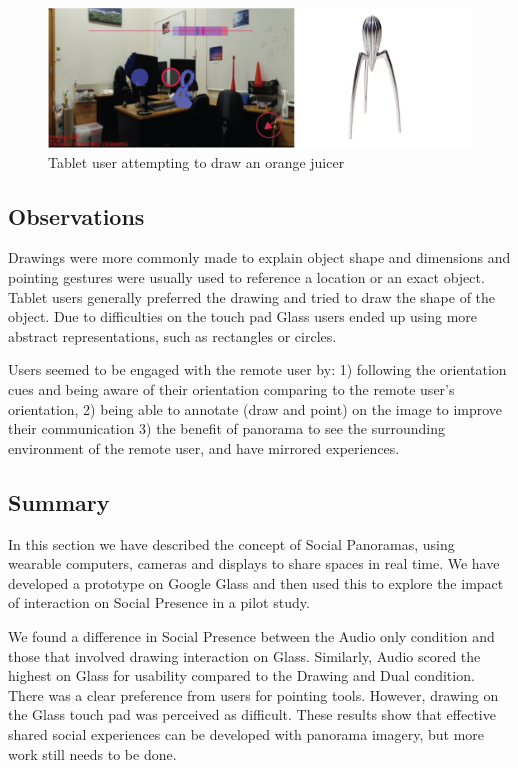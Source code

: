 \begin{figure}[ht]
	\centering
	\includegraphics[width=\linewidth]{images/ismar14/tablet-drawing}
	\caption{Tablet user attempting to draw an orange juicer}
	\label{fig:ismar14:tablet-drawing}
\end{figure}

\subsection{Observations}

Drawings were more commonly made to explain object shape and dimensions and pointing gestures were usually used to reference a location or an exact object. Tablet users generally preferred the drawing and tried to draw the shape of the object. Due to difficulties on the touch pad Glass users ended up using more abstract representations, such as rectangles or circles.

Users seemed to be engaged with the remote user by: 1) following the orientation cues and being aware of their orientation comparing to the remote user's orientation, 2) being able to annotate (draw and point) on the image to improve their communication 3) the benefit of panorama to see the surrounding environment of the remote user, and have mirrored experiences.


\subsection{Summary}

In this section we have described the concept of Social Panoramas, using wearable computers, cameras and displays to share spaces in real time. We have developed a prototype on Google Glass and then used this to explore the impact of interaction on Social Presence in a pilot study. 

We found a difference in Social Presence between the Audio only condition and those that involved drawing interaction on Glass. Similarly, Audio scored the highest on Glass for usability compared to the Drawing and Dual condition. There was a clear preference from users for pointing tools. However, drawing on the Glass touch pad was perceived as difficult. These results show that effective shared social experiences can be developed with panorama imagery, but more work still needs to be done.

